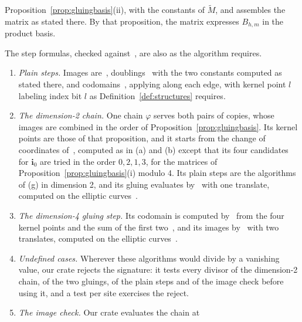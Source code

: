 \documentclass[version=preprint]{iacrcc}
\begin{document}
\begin{remark}[Conformance]
\begin{enumerate}[label=(\alph*)]
            Proposition~\ref{prop:gluingbasis}(ii), with the constants of $\tilde
            M$, and assembles the matrix as stated there. By that proposition,
            the matrix expresses $B_{h,m}$ in the product basis.
        \end{enumerate}
        The step formulas, checked against~\cite{Dar24}, are also as the
        algorithm requires.
        \begin{enumerate}[label=(\alph*), resume]
            \item \emph{Plain steps.} Images are~\cite[Algorithm 1]{Dar24},
            doublings~\cite[Algorithm 8]{Dar24} with the two constants computed as
            stated there, and codomains~\cite[Algorithms 2--4]{Dar24}, applying
            \cite[Eq.~(21)]{Dar24} along each edge, with kernel point $l$ labeling
            index bit $l$ as Definition~\ref{def:structures} requires.
            \item \emph{The dimension-2 chain.} One chain $\varphi$ serves both
            pairs of copies, whose images are combined in the order of
            Proposition~\ref{prop:gluingbasis}. Its kernel points are those of
            that proposition, and it starts from the change of coordinates
            of~\cite[Theorem 12]{Dar24}, computed as in (a) and (b) except that
            its four candidates for $\mathbf i_0$ are tried in the order $0, 2, 1,
            3$, for the
            matrices of Proposition~\ref{prop:gluingbasis}(i) modulo 4. Its plain
            steps are the algorithms of (g) in dimension 2, and its gluing
            evaluates by~\cite[Eqs.~(20), (24) and (25)]{Dar24} with one translate,
            computed on the elliptic curves~\cite[Remarks 19 and 20]{Dar24}.
            \item \emph{The dimension-4 gluing step.} Its codomain is computed
            by~\cite[Algorithm 4]{Dar24} from the four kernel points and the sum of
            the first two~\cite[Remark 21]{Dar24}, and its images
            by~\cite[Algorithm 5]{Dar24} with two translates, computed on the
            elliptic curves~\cite[Remarks 19 and 20]{Dar24}.
            \item \emph{Undefined cases.} Wherever these algorithms would divide by
            a vanishing value, our crate rejects the signature: it tests every
            divisor of the dimension-2 chain, of the two gluings, of the plain
            steps and of the image check before using it, and a test per site
            exercises the reject.
            \item \emph{The image check.} Our crate evaluates the chain at

\end{enumerate}
\end{remark}
\end{document}
